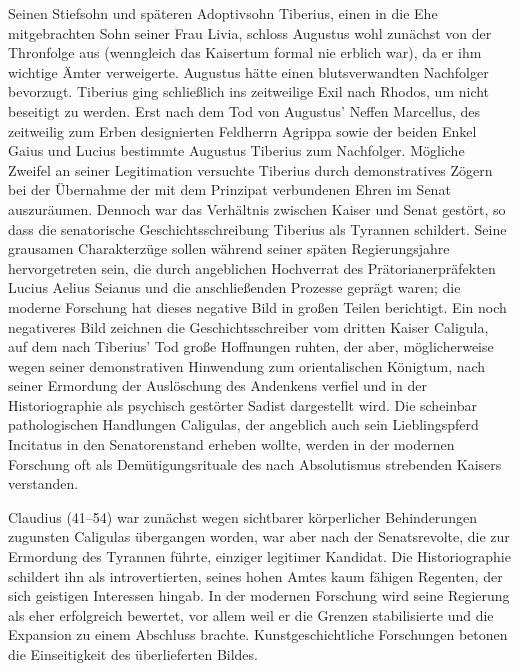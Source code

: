 Seinen Stiefsohn und späteren Adoptivsohn \gls{Tiberius}, einen in die Ehe mitgebrachten Sohn seiner Frau Livia, schloss Augustus wohl zunächst von der Thronfolge aus (wenngleich das Kaisertum formal nie erblich war), da er ihm wichtige Ämter verweigerte. Augustus hätte einen blutsverwandten Nachfolger bevorzugt. Tiberius ging schließlich ins zeitweilige Exil nach Rhodos, um nicht beseitigt zu werden. Erst nach dem Tod von Augustus’ Neffen Marcellus, des zeitweilig zum Erben designierten Feldherrn Agrippa sowie der beiden Enkel Gaius und Lucius bestimmte Augustus Tiberius zum Nachfolger. Mögliche Zweifel an seiner Legitimation versuchte Tiberius durch demonstratives Zögern bei der Übernahme der mit dem Prinzipat verbundenen Ehren im Senat auszuräumen. Dennoch war das Verhältnis zwischen Kaiser und Senat gestört, so dass die senatorische Geschichtsschreibung Tiberius als Tyrannen schildert. Seine grausamen Charakterzüge sollen während seiner späten Regierungsjahre hervorgetreten sein, die durch angeblichen Hochverrat des Prätorianerpräfekten Lucius Aelius Seianus und die anschließenden Prozesse geprägt waren; die moderne Forschung hat dieses negative Bild in großen Teilen berichtigt.
Ein noch negativeres Bild zeichnen die Geschichtsschreiber vom dritten Kaiser \gls{Caligula}, auf dem nach Tiberius’ Tod große Hoffnungen ruhten, der aber, möglicherweise wegen seiner demonstrativen Hinwendung zum orientalischen Königtum, nach seiner Ermordung der Auslöschung des Andenkens verfiel und in der Historiographie als psychisch gestörter Sadist dargestellt wird. Die scheinbar pathologischen Handlungen Caligulas, der angeblich auch sein Lieblingspferd Incitatus in den Senatorenstand erheben wollte, werden in der modernen Forschung oft als Demütigungsrituale des nach Absolutismus strebenden Kaisers verstanden.

Claudius (41–54) war zunächst wegen sichtbarer körperlicher Behinderungen zugunsten Caligulas übergangen worden, war aber nach der Senatsrevolte, die zur Ermordung des Tyrannen führte, einziger legitimer Kandidat. Die Historiographie schildert ihn als introvertierten, seines hohen Amtes kaum fähigen Regenten, der sich geistigen Interessen hingab. In der modernen Forschung wird seine Regierung als eher erfolgreich bewertet, vor allem weil er die Grenzen stabilisierte und die Expansion zu einem Abschluss brachte. Kunstgeschichtliche Forschungen betonen die Einseitigkeit des überlieferten Bildes.

